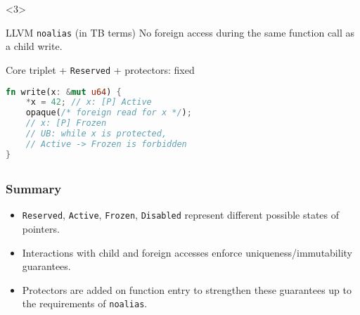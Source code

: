 \begin{frame}[fragile]
    \begin{onlyenv}<3>
        \begin{alertblock}{LLVM \texttt{noalias} (in TB terms)}
            No foreign access during the same function call as a child write.
        \end{alertblock}

        \begin{block}{Core triplet + \texttt{Reserved} + protectors: fixed}
            \begin{lstlisting}[language=rust, escapechar=@]
fn write(x: &mut u64) {
    *x = 42; // x: [P] Active
    opaque(/* foreign read for x */);
    // x: [P] Frozen
    // UB: while x is protected,
    // Active -> Frozen is forbidden
}
            \end{lstlisting}
        \end{block}
    \end{onlyenv}
\end{frame}

\subsection*{}

\begin{frame}
    \frametitle{Summary}
    \begin{itemize}
        \item \texttt{Reserved}, \texttt{Active}, \texttt{Frozen}, \texttt{Disabled}
            represent different possible states of pointers.\\
        \item Interactions with child and foreign accesses enforce uniqueness/immutability guarantees.
        \item Protectors are added on function entry to strengthen these guarantees up to the
            requirements of \texttt{noalias}.\\
    \end{itemize}
\end{frame}
